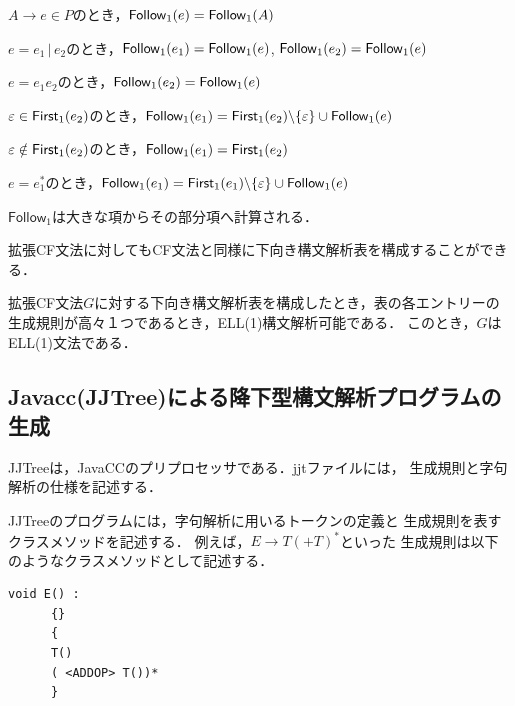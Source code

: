 \documentclass[a4j,dvipdfmx]{jbook}
\begin{document}
\begin{Def}
  $A\rightarrow e\in P$のとき，$\mathsf{Follow}_1({e})=\mathsf{Follow}_1({A})$
  \begin{list}{}{}
    \item $e=e_1\,|\,e_2$のとき，$\mathsf{Follow}_1({e_1})=\mathsf{Follow}_1({e})$, $\mathsf{Follow}_1({e_2})=\mathsf{Follow}_1({e})$
    \item $e=e_1 e_2$のとき，$\mathsf{Follow}_1({e_2})=\mathsf{Follow}_1({e})$
          \begin{list}{}{}
            \item $\varepsilon\in\mathsf{First}_1({e_2})$のとき，$\mathsf{Follow}_1({e_1})=\mathsf{First}_1({e_2})\backslash\{\varepsilon\}\cup\mathsf{Follow}_1({e})$
            \item $\varepsilon\notin\mathsf{First}_1({e_2})$のとき，$\mathsf{Follow}_1({e_1})=\mathsf{First}_1({e_2})$
          \end{list}
    \item $e=e_1^\ast$のとき，$\mathsf{Follow}_1({e_1})=\mathsf{First}_1({e_1})\backslash\{\varepsilon\}\cup\mathsf{Follow}_1({e})$
  \end{list}

  $\mathsf{Follow}_1$は大きな項からその部分項へ計算される．
\end{Def}

拡張CF文法に対してもCF文法と同様に下向き構文解析表を構成することができる．

\begin{Def}
  拡張CF文法$G$に対する下向き構文解析表を構成したとき，表の各エントリーの
  生成規則が高々１つであるとき，ELL(1)構文解析可能である．
  このとき，$G$はELL(1)文法である．
\end{Def}

\subsection{Javacc(JJTree)による降下型構文解析プログラムの生成}

JJTreeは，JavaCCのプリプロセッサである．jjtファイルには，
生成規則と字句解析の仕様を記述する．

JJTreeのプログラムには，字句解析に用いるトークンの定義と
生成規則を表すクラスメソッドを記述する．
例えば，$E\rightarrow T(\texttt{+}T)^\ast$といった
生成規則は以下のようなクラスメソッドとして記述する．

\begin{center}
  \begin{minipage}{0.5\textwidth}
    \begin{Verbatim}[frame=single]
      void E() :
      {}
      {
      T()
      ( <ADDOP> T())*
      }
    \end{Verbatim}
  \end{minipage}
\end{center}
\end{document}
